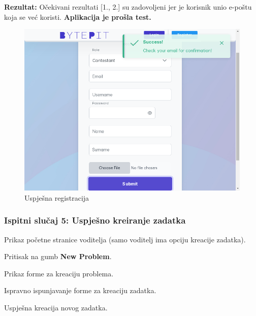 			\noindent \textbf{Rezultat:} Očekivani rezultati [1., 2.] su zadovoljeni jer je korisnik unio e-poštu koja se već koristi. \textbf{Aplikacija je prošla test.}
			
			\begin{figure}[H]
				\includegraphics[scale=0.50]{slike/registration_new_user_test_result.PNG}
				\centering
				\caption{Uspješna registracija}
				\label{fig:failed_register}
			\end{figure}
			
			\eject
			
			\subsubsection{Ispitni slučaj 5: Uspješno kreiranje zadatka}
			
			
			\begin{packed_enum}
				
				\item  Prikaz početne stranice voditelja (samo voditelj ima opciju kreacije zadatka).
				\item  Pritisak na gumb \textbf{New Problem}.
				\item  Prikaz forme za kreaciju problema.
				\item  Ispravno ispunjavanje forme za kreaciju zadatka.
				
			\end{packed_enum}
			
			\begin{packed_enum}
				
				\item  Uspješna kreacija novog zadatka.
				
			\end{packed_enum}
			
